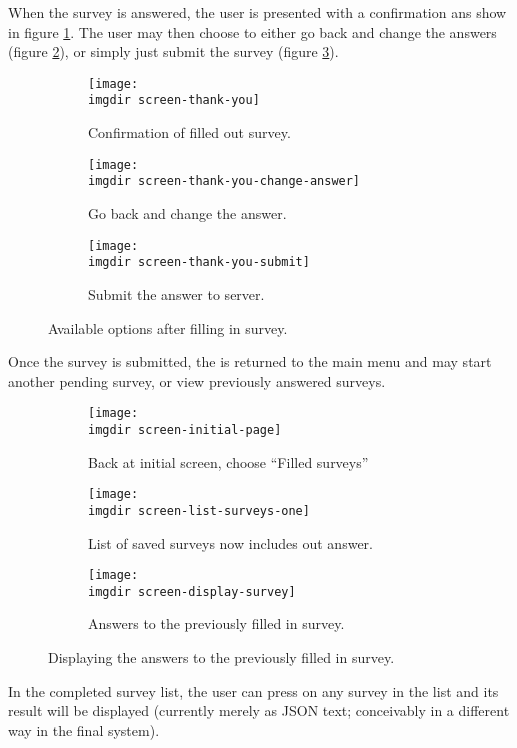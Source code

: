 When the survey is answered, the user is presented with a confirmation ans show in figure \ref{fig:screen-thank-you}. The user may then choose to either go back and change the answers (figure \ref{fig:screen-thank-you-change-answer}), or simply just submit the survey (figure \ref{fig:screen-thank-you-submit}).

\begin{figure}[!htbp]
  \centering
  \begin{subfigure}{.3\textwidth}
    \centering
    \texttt{[image: \\imgdir screen-thank-you]}
    \caption{Confirmation of filled out survey.}
    \label{fig:screen-thank-you}
  \end{subfigure}
  \begin{subfigure}{.3\textwidth}
    \centering
    \texttt{[image: \\imgdir screen-thank-you-change-answer]}
    \caption{Go back and change the answer.}
    \label{fig:screen-thank-you-change-answer}
  \end{subfigure}
  \begin{subfigure}{.3\textwidth}
    \centering
    \texttt{[image: \\imgdir screen-thank-you-submit]}
    \caption{Submit the answer to server.}
    \label{fig:screen-thank-you-submit}
  \end{subfigure}
  \caption{Available options after filling in survey.}
  \label{fig:screen-post-survey-action}
\end{figure}

Once the survey is submitted, the is returned to the main menu and may start another pending survey, or view previously answered surveys.
\newpage

\begin{figure}[!htbp]
  \centering
  \begin{subfigure}{.3\textwidth}
    \centering
    \texttt{[image: \\imgdir screen-initial-page]}
    \caption{Back at initial screen, choose ``Filled surveys''}
    \label{fig:screen-initial-page-again}
  \end{subfigure}
  \begin{subfigure}{.3\textwidth}
    \centering
    \texttt{[image: \\imgdir screen-list-surveys-one]}
    \caption{List of saved surveys now includes out answer.}
    \label{fig:screen-list-surveys-one}
  \end{subfigure}
  \begin{subfigure}{.3\textwidth}
    \centering
    \texttt{[image: \\imgdir screen-display-survey]}
    \caption{Answers to the previously filled in survey.}
    \label{fig:screen-display-survey}
  \end{subfigure}
  \caption{Displaying the answers to the previously filled in survey.}
  \label{fig:screen-display-filled-in-survey}
\end{figure}

In the completed survey list, the user can press on any survey in the list and its result will be displayed (currently merely as JSON text; conceivably in a different way in the final system).
